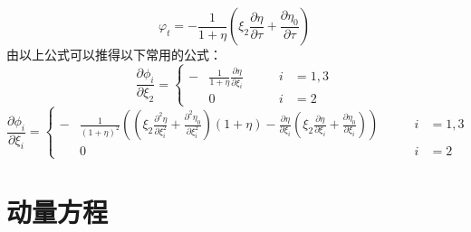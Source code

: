 \documentclass{ctexart}
\begin{document}
	\begin{equation}
	\varphi_t = -\frac{1}{1+\eta}(\xi_2\frac{\partial\eta}{\partial\tau} + \frac{\partial\eta_0}{\partial\tau})
	\end{equation}
	由以上公式可以推得以下常用的公式：
	\begin{equation}
	\frac{\partial\phi_i}{\partial\xi_2} = 
	\left\{
	\begin{aligned}
	-&\frac{1}{1+\eta}\frac{\partial\eta}{\partial\xi_i} \qquad &i&=1,3\\
	&0 \qquad &i&=2
	\end{aligned}
	\right.
	\end{equation}
	\begin{equation}
	\frac{\partial\phi_i}{\partial\xi_i} = 
	\left\{
	\begin{aligned}
	-&\frac{1}{(1+\eta)^2}((\xi_2\frac{\partial^2\eta}{\partial \xi_i^2}+\frac{\partial^2\eta_0}{\partial\xi_i^2})(1+\eta) - \frac{\partial\eta}{\partial\xi_i}(\xi_2\frac{\partial\eta}{\partial\xi_i}+\frac{\partial\eta_0}{\partial\xi_i}))\qquad &i&=1,3\\
	&0\qquad &i&=2
	\end{aligned}
	\right.
	\end{equation}
	\section{动量方程}
\end{document}
